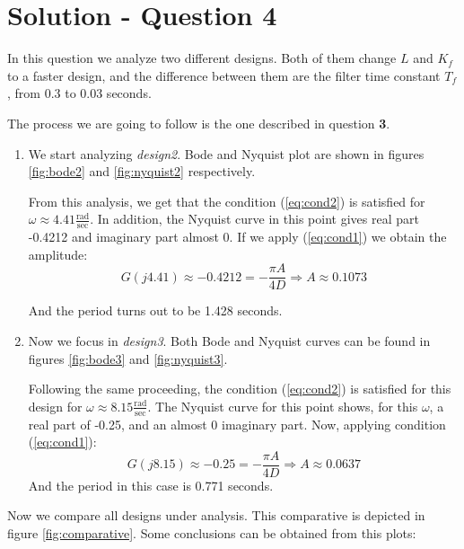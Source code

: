 \section*{Solution - Question 4}

In this question we analyze two different designs. Both of them change $L$ and $K_f$ to a faster design, and the difference between them are the filter time constant $T_f$, from 0.3 to 0.03 seconds. 

The process we are going to follow is the one described in question \textbf{3}. 

\begin{enumerate}
\item We start analyzing \textit{design2}. Bode and Nyquist plot are shown in figures \ref{fig:bode2} and \ref{fig:nyquist2} respectively. 

From this analysis, we get that the condition (\ref{eq:cond2}) is satisfied for  $\omega \approx 4.41 \frac{\textrm{rad}}{\textrm{sec}}$. In addition, the Nyquist curve in this point gives real part -0.4212 and imaginary part almost 0. If we apply (\ref{eq:cond1}) we obtain the amplitude:
$$ G(j4.41) \approx -0.4212 = -\frac{\pi A}{4D} \Rightarrow A \approx 0.1073$$

And the period turns out to be 1.428 seconds. 

\item Now we focus in \textit{design3}. Both Bode and Nyquist curves can be found in figures \ref{fig:bode3} and \ref{fig:nyquist3}. 

Following the same proceeding, the condition (\ref{eq:cond2}) is satisfied for this design for $\omega \approx 8.15 \frac{\textrm{rad}}{\textrm{sec}}$. The Nyquist curve for this point shows, for this $\omega$, a real part of -0.25, and an almost 0 imaginary part. Now, applying condition (\ref{eq:cond1}):
$$ G(j8.15) \approx -0.25 = -\frac{\pi A}{4D} \Rightarrow A \approx 0.0637$$
And the period in this case is 0.771 seconds. 
\end{enumerate}

Now we compare all designs under analysis. This comparative is depicted in figure \ref{fig:comparative}. Some conclusions can be obtained from this plots: 

